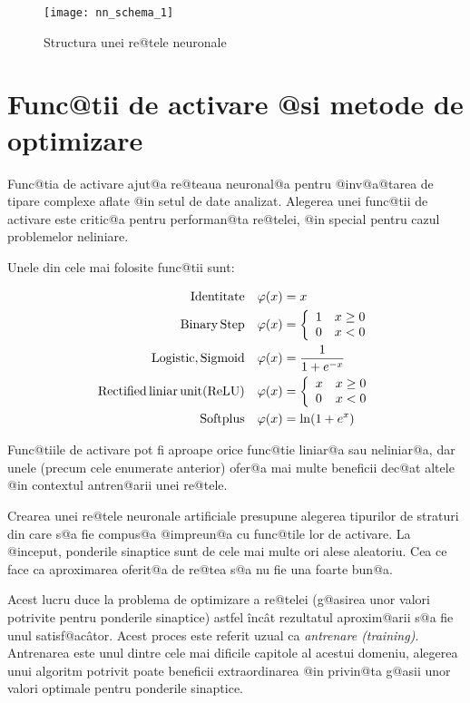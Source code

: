 \begin{figure}[h]
	\centering
	\texttt{[image: nn\_schema\_1]}
	\caption{Structura unei re@tele neuronale}
	\label{nn:schema}
\end{figure}




\section{Func@tii de activare @si metode de optimizare}
Func@tia de activare ajut@a re@teaua neuronal@a pentru @inv@a@tarea de tipare complexe aflate @in setul de date analizat. Alegerea unei func@tii de activare este critic@a pentru performan@ta re@telei, @in special pentru cazul problemelor neliniare.

Unele din cele mai folosite func@tii sunt:

\begin{align}
	{\rm Identitate} \quad \varphi (x) &= x \\
	{\rm Binary \, Step} \quad \varphi (x) &= \left\lbrace
		\begin{array}{lc}
			1 & x \geq 0 \\
			0 & x < 0
		\end{array}
	\right. \\
	{\rm Logistic, Sigmoid} \quad \varphi (x) &= \displaystyle\frac{1}{1 + e^{-x}} \\
	{\rm Rectified\, liniar\, unit (ReLU)} \quad \varphi (x) &= \left\lbrace
		\begin{array}{lc}
			x & x \geq 0 \\
			0 & x < 0
		\end{array}
	\right. \label{eq:relu} \\
	{\rm Softplus} \quad \varphi (x) &= \ln ( 1 + e^x) 
\end{align}

Func@tiile de activare pot fi aproape orice func@tie liniar@a sau neliniar@a, dar unele  (precum cele enumerate anterior) ofer@a mai multe beneficii dec@at altele @in contextul antren@arii unei re@tele.

Crearea unei re@tele neuronale artificiale presupune alegerea tipurilor de straturi din care s@a fie compus@a @impreun@a cu func@tile lor de activare. La @inceput, ponderile sinaptice sunt de cele mai multe ori alese aleatoriu. Cea ce face ca aproximarea oferit@a de re@tea s@a nu fie una foarte bun@a.

Acest lucru duce la problema de optimizare a re@telei (g@asirea unor valori potrivite pentru ponderile sinaptice) astfel \^inc\^ at rezultatul aproxim@arii s@a fie unul satisf@ac\^ ator. Acest proces este referit uzual ca {\sl antrenare (training)}. Antrenarea este unul dintre cele mai dificile capitole al acestui domeniu, alegerea unui algoritm potrivit poate beneficii extraordinarea @in privin@ta g@asii unor valori optimale pentru ponderile sinaptice.

